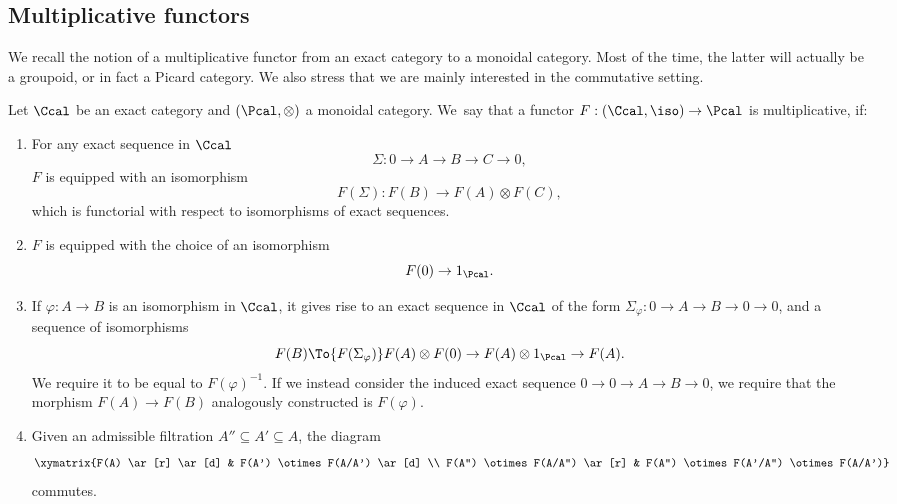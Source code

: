 \subsection{Multiplicative functors}\label{subsec:multfunctor}
We recall the notion of a multiplicative functor from an exact category to a monoidal category. Most of the time, the latter will actually be a groupoid, or in fact a Picard category. We also stress that we are mainly interested in the commutative setting.
\begin{definition}\label{def:multiplicative-functor}
Let $\Ccal$ be an exact category and $(\Pcal,\otimes)$ a monoidal category. We~say that a functor $F: (\Ccal, \iso) \to \Pcal$ is multiplicative, if:
\begin{enumerate}
\item\label{item:mult-funct-1} For any exact sequence in $\Ccal$
\begin{displaymath}
\Sigma\colon 0 \to A \to B \to C \to 0,
\end{displaymath}
$F$ is equipped with an isomorphism
\begin{displaymath}
F(\Sigma): F(B) \to F(A) \otimes F(C),
\end{displaymath}
which is functorial with respect to isomorphisms of exact sequences.
\item\label{item:mult-funct-2} $F$ is equipped with the choice of an isomorphism
\begin{displaymath}
F(0) \to 1_{\Pcal}.
\end{displaymath}
\item\label{item:mult-funct-3} If $\varphi\colon A \to B$ is an isomorphism in $\Ccal$, it gives rise to an exact sequence in $\Ccal$ of the form $\Sigma_{\varphi}: 0 \to A \to B \to 0 \to 0$, and a sequence of isomorphisms
\begin{displaymath}
F(B) \To{F(\Sigma_{\varphi})} F(A) \otimes F(0) \to F(A) \otimes 1_{\Pcal} \to F(A).
\end{displaymath}
We require it to be equal to $F(\varphi)^{-1}$. If we instead consider the induced exact sequence $0 \to 0 \to A \to B \to 0$, we require that the morphism $F(A) \to F(B)$ analogously constructed is $F(\varphi)$.
\item\label{item:mult-funct-4} Given an admissible filtration $A'' \subseteq A' \subseteq A$, the diagram
\begin{displaymath}
\xymatrix{F(A) \ar[r] \ar[d] & F(A') \otimes F(A/A') \ar[d] \\
F(A'') \otimes F(A/A'') \ar[r] & F(A'') \otimes F(A'/A'') \otimes F(A/A')}
\end{displaymath}
commutes.


\end{enumerate}
\end{definition}
